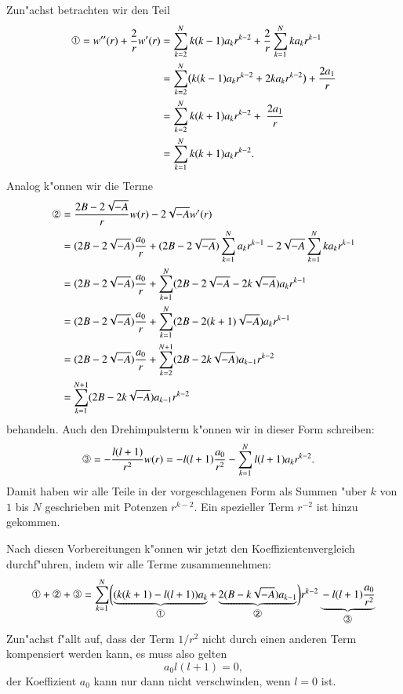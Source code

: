 Zun"achst betrachten wir den Teil
\begin{align*}
\text{\ding{192}}=
w''(r)+\frac2{r}w'(r)
&=
\sum_{k=2}^N k(k-1)a_kr^{k-2} + \frac{2}{r}\sum_{k=1}^Nka_kr^{k-1}
\\
&=
\sum_{k=2}^N\bigl(k(k-1)a_kr^{k-2} + 2ka_kr^{k-2}\bigr) + \frac{2a_1}{r}
\\
&=
\sum_{k=2}^Nk(k+1)a_kr^{k-2} + \frac{2a_1}r
\\
&=
\sum_{k=1}^Nk(k+1)a_kr^{k-2}.
\end{align*}
Analog k"onnen wir die Terme 
\begin{align*}
\text{\ding{193}}&=
\frac{2B-2\sqrt{-A}}{r}w(r)-2\sqrt{-A}w'(r)
\\
&=
(2B-2\sqrt{-A})\frac{a_0}{r}
+
(2B-2\sqrt{-A})\sum_{k=1}^Na_kr^{k-1}
-2\sqrt{-A}\sum_{k=1}^Nka_kr^{k-1}
\\
&=
(2B-2\sqrt{-A})\frac{a_0}{r}
+
\sum_{k=1}^N
(2B-2\sqrt{-A}
-2k\sqrt{-A})a_kr^{k-1}
\\
&=
(2B-2\sqrt{-A})\frac{a_0}{r}
+
\sum_{k=1}^N
(2B-2(k+1)\sqrt{-A})a_kr^{k-1}
\\
&=
(2B-2\sqrt{-A})\frac{a_0}{r}
+
\sum_{k=2}^{N+1}
(2B-2k\sqrt{-A})a_{k-1}r^{k-2}
\\
&=
\sum_{k=1}^{N+1}
(2B-2k\sqrt{-A})a_{k-1}r^{k-2}
\end{align*}
behandeln.
Auch den Drehimpulsterm k"onnen wir in dieser Form schreiben:
\begin{align*}
\text{\ding{194}}=
-\frac{l(l+1)}{r^2}w(r)
&=
-l(l+1)\frac{a_0}{r^2}
-
\sum_{k=1}^Nl(l+1)a_kr^{k-2}.
\end{align*}
Damit haben wir alle Teile in der vorgeschlagenen Form als Summen
"uber $k$ von $1$ bis $N$ geschrieben mit Potenzen $r^{k-2}$.
Ein spezieller Term $r^{-2}$ ist hinzu gekommen.

Nach diesen Vorbereitungen k"onnen wir jetzt den Koeffizientenvergleich
durchf"uhren, indem wir alle Terme zusammennehmen:
\begin{equation}
\text{\ding{192}}
+
\text{\ding{193}}
+
\text{\ding{194}}
=
\sum_{k=1}^{N}
\biggl(
\underbrace{
(k(k+1)-l(l+1))a_k
}_{\text{\normalsize\ding{192}}}
+
\underbrace{
2(B-k\sqrt{-A})a_{k-1}
}_{\text{\normalsize\ding{193}}}
\biggr)r^{k-2}
\underbrace{
\mathstrut
-l(l+1)\frac{a_0}{r^2}
}_{\text{\normalsize\ding{194}}}
\label{skript:wkoeffizientenvergleich}
\end{equation}
Zun"achst f"allt auf, dass der Term $1/r^2$ nicht durch einen anderen
Term kompensiert werden kann, es muss also gelten
\[
a_0l(l+1)=0,
\]
der Koeffizient $a_0$ kann nur dann nicht verschwinden, wenn $l=0$ ist.

